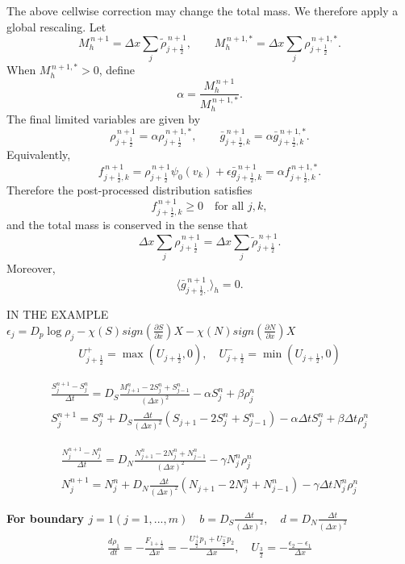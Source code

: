 \documentclass[11pt,twoside]{article}
\numberwithin{equation}{section}
\theoremstyle{plain}
\theoremstyle{nonumberplain}
\begin{document}
The above cellwise correction may change the total mass. We therefore
apply a global rescaling. Let
\[
    M_h^{\,n+1}
    =
    \Delta x\sum_j \tilde\rho_{j+\frac12}^{\,n+1},
    \qquad
    M_h^{\,n+1,*}
    =
    \Delta x\sum_j \rho_{j+\frac12}^{\,n+1,*}.
\]
When \(M_h^{\,n+1,*}>0\), define
\[
    \alpha
    =
    \frac{M_h^{\,n+1}}{M_h^{\,n+1,*}} .
\]
The final limited variables are given by
\[
    \rho_{j+\frac12}^{\,n+1}
    =
    \alpha \rho_{j+\frac12}^{\,n+1,*},
    \qquad
    \bar g_{j+\frac12,k}^{\,n+1}
    =
    \alpha \bar g_{j+\frac12,k}^{\,n+1,*}.
\]
Equivalently,
\[
    f_{j+\frac12,k}^{\,n+1}
    =
    \rho_{j+\frac12}^{\,n+1}\psi_0(v_k)
    +
    \epsilon \bar g_{j+\frac12,k}^{\,n+1}
    =
    \alpha f_{j+\frac12,k}^{\,n+1,*}.
\]
Therefore the post-processed distribution satisfies
\[
    f_{j+\frac12,k}^{\,n+1}\ge0
    \quad \text{for all } j,k,
\]
and the total mass is conserved in the sense that
\[
    \Delta x\sum_j \rho_{j+\frac12}^{\,n+1}
    =
    \Delta x\sum_j \tilde\rho_{j+\frac12}^{\,n+1}.
\]
Moreover,
\[
    \langle \bar g_{j+\frac12,\cdot}^{\,n+1}\rangle_h=0 .
\]

\iffalse
IN THE EXAMPLE\\
$\epsilon_j=D_p \log \rho_j-\chi(S) sign(\frac{\partial S}{\partial x})X-\chi(N) sign(\frac{\partial N}{\partial x})X$
\begin{eqnarray}
U^+_{j+\frac{1}{2}}=\max(U_{j+\frac{1}{2}},0), \quad U^-_{j+\frac{1}{2}}=\min (U_{j+\frac{1}{2}},0)
\end{eqnarray}

\begin{eqnarray}
\frac{S_j^{n+1}-S_j^n}{\Delta t}=D_S\frac{M_{j+1}^n-2S_j^n+S_{j-1}^n}{(\Delta x)^2}-\alpha S_j^n+\beta \rho_j^n\\
S_j^{n+1}=S_j^n+D_S \frac{\Delta t} {(\Delta x)^2}(S_{j+1}-2S_j^n+S_{j-1}^n)-\alpha \Delta t S_j^n+\beta \Delta t \rho_j^n
\end{eqnarray}


\begin{eqnarray}
\frac{N_j^{n+1}-N_j^n}{\Delta t}=D_N\frac{N_{j+1}^n-2N_j^n+N_{j-1}^n}{(\Delta x)^2}-\gamma N_j^n \rho_j^n\\
N_j^{n+1}=N_j^n+D_N \frac{\Delta t} {(\Delta x)^2}(N_{j+1}-2N_j^n+N_{j-1}^n)-\gamma \Delta t N_j^n \rho_j^n
\end{eqnarray}

\textbf{ For boundary $ j=1(j=1,...,m) \quad b=D_S \frac{\Delta t} {(\Delta x)^2}, \quad d=D_N \frac{\Delta t} {(\Delta x)^2}$}
\begin{eqnarray}
\frac{d\rho_1}{dt}=-\frac{F_{1+\frac{1}{2}}}{\Delta x}=-\frac{U^+_{\frac{3}{2}}p_1+U^-_{\frac{3}{2}}p_2 }{\Delta x}, \quad U_{\frac{3}{2}}=-\frac{\epsilon_2-\epsilon_1}{\Delta x}
\end{eqnarray}
\end{document}
